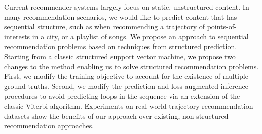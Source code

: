 
Current recommender systems largely focus on static, unstructured content.
In many recommendation scenarios, we would like to predict content that has sequential structure,
such as when recommending a trajectory of points-of-interests in a city, or a playlist of songs.
We propose an approach to sequential recommendation problems based
on techniques from structured prediction.
Starting from a classic structured support vector machine,
we propose two changes to the method %
enabling us to solve structured recommendation problems.
First, we modify the training objective to account for the existence of multiple ground truths.
Second, we modify the prediction and loss augmented inference procedures to avoid predicting loops in the sequence via an extension of the classic Viterbi algorithm.
Experiments on real-world trajectory recommendation datasets show the benefits of our approach over existing, non-structured recommendation approaches.
